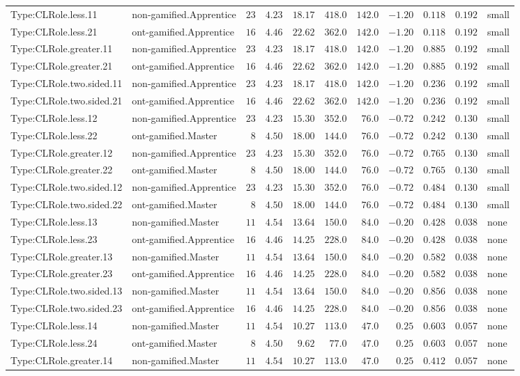 \documentclass[6pt,a4paper]{article}
\begin{document}
{\begin{longtable}{llrrrrrrrrl}
Type:CLRole.less.11&non-gamified.Apprentice&$23$&$4.23$&$18.17$&$418.0$&$142.0$&$-1.20$&$0.118$&$0.192$&small\tabularnewline
Type:CLRole.less.21&ont-gamified.Apprentice&$16$&$4.46$&$22.62$&$362.0$&$142.0$&$-1.20$&$0.118$&$0.192$&small\tabularnewline
Type:CLRole.greater.11&non-gamified.Apprentice&$23$&$4.23$&$18.17$&$418.0$&$142.0$&$-1.20$&$0.885$&$0.192$&small\tabularnewline
Type:CLRole.greater.21&ont-gamified.Apprentice&$16$&$4.46$&$22.62$&$362.0$&$142.0$&$-1.20$&$0.885$&$0.192$&small\tabularnewline
Type:CLRole.two.sided.11&non-gamified.Apprentice&$23$&$4.23$&$18.17$&$418.0$&$142.0$&$-1.20$&$0.236$&$0.192$&small\tabularnewline
Type:CLRole.two.sided.21&ont-gamified.Apprentice&$16$&$4.46$&$22.62$&$362.0$&$142.0$&$-1.20$&$0.236$&$0.192$&small\tabularnewline
Type:CLRole.less.12&non-gamified.Apprentice&$23$&$4.23$&$15.30$&$352.0$&$ 76.0$&$-0.72$&$0.242$&$0.130$&small\tabularnewline
Type:CLRole.less.22&ont-gamified.Master&$ 8$&$4.50$&$18.00$&$144.0$&$ 76.0$&$-0.72$&$0.242$&$0.130$&small\tabularnewline
Type:CLRole.greater.12&non-gamified.Apprentice&$23$&$4.23$&$15.30$&$352.0$&$ 76.0$&$-0.72$&$0.765$&$0.130$&small\tabularnewline
Type:CLRole.greater.22&ont-gamified.Master&$ 8$&$4.50$&$18.00$&$144.0$&$ 76.0$&$-0.72$&$0.765$&$0.130$&small\tabularnewline
Type:CLRole.two.sided.12&non-gamified.Apprentice&$23$&$4.23$&$15.30$&$352.0$&$ 76.0$&$-0.72$&$0.484$&$0.130$&small\tabularnewline
Type:CLRole.two.sided.22&ont-gamified.Master&$ 8$&$4.50$&$18.00$&$144.0$&$ 76.0$&$-0.72$&$0.484$&$0.130$&small\tabularnewline
Type:CLRole.less.13&non-gamified.Master&$11$&$4.54$&$13.64$&$150.0$&$ 84.0$&$-0.20$&$0.428$&$0.038$&none\tabularnewline
Type:CLRole.less.23&ont-gamified.Apprentice&$16$&$4.46$&$14.25$&$228.0$&$ 84.0$&$-0.20$&$0.428$&$0.038$&none\tabularnewline
Type:CLRole.greater.13&non-gamified.Master&$11$&$4.54$&$13.64$&$150.0$&$ 84.0$&$-0.20$&$0.582$&$0.038$&none\tabularnewline
Type:CLRole.greater.23&ont-gamified.Apprentice&$16$&$4.46$&$14.25$&$228.0$&$ 84.0$&$-0.20$&$0.582$&$0.038$&none\tabularnewline
Type:CLRole.two.sided.13&non-gamified.Master&$11$&$4.54$&$13.64$&$150.0$&$ 84.0$&$-0.20$&$0.856$&$0.038$&none\tabularnewline
Type:CLRole.two.sided.23&ont-gamified.Apprentice&$16$&$4.46$&$14.25$&$228.0$&$ 84.0$&$-0.20$&$0.856$&$0.038$&none\tabularnewline
Type:CLRole.less.14&non-gamified.Master&$11$&$4.54$&$10.27$&$113.0$&$ 47.0$&$ 0.25$&$0.603$&$0.057$&none\tabularnewline
Type:CLRole.less.24&ont-gamified.Master&$ 8$&$4.50$&$ 9.62$&$ 77.0$&$ 47.0$&$ 0.25$&$0.603$&$0.057$&none\tabularnewline
Type:CLRole.greater.14&non-gamified.Master&$11$&$4.54$&$10.27$&$113.0$&$ 47.0$&$ 0.25$&$0.412$&$0.057$&none\tabularnewline

\end{longtable}}
\end{document}
